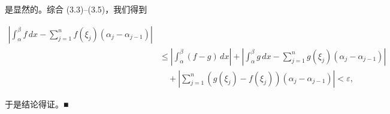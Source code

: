 \begin{theorem}
\begin{subitems}
是显然的。综合 (3.3)–(3.5)，我们得到

\begin{equation*}
\begin{aligned}
\left| \int_{\alpha}^{\beta} f \, dx - \sum_{j=1}^{n} f(\xi_j)(\alpha_j - \alpha_{j-1}) \right| & \\ &\le \left| \int_{\alpha}^{\beta} (f - g) \, dx \right| + \left| \int_{\alpha}^{\beta} g \, dx - \sum_{j=1}^{n} g(\xi_j)(\alpha_j - \alpha_{j-1}) \right| \\ &\quad + \left| \sum_{j=1}^{n} (g(\xi_j) - f(\xi_j))(\alpha_j - \alpha_{j-1}) \right| < \varepsilon ,
\end{aligned}
\end{equation*}

于是结论得证。\nobreak\hspace{0.35em}■

\end{subitems}

\end{theorem}

